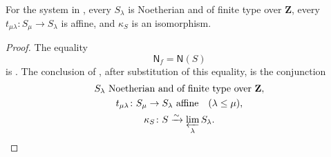 \begin{lemma}
  \label{lemma:nagata-final-noetherian-base-system}
  \checked\lean{}

  For the system in
  , every $S_\lambda$ is
  Noetherian and of finite type over $\mathbf Z$, every
  $t_{\mu\lambda}\colon S_\mu\to S_\lambda$ is affine, and $\kappa_S$ is an
  isomorphism.
\end{lemma}

\begin{proof}
\checked
  The equality
  \[
    \mathsf N_f=\mathsf N(S)
  \]
  is .  The conclusion of
  , after substitution of this
  equality, is the conjunction
  \[
  \begin{gathered}
    S_\lambda\text{ Noetherian and of finite type over }\mathbf Z,\\
    t_{\mu\lambda}\colon S_\mu\to S_\lambda\text{ affine}
      \quad(\lambda\leq\mu),\\
    \kappa_S\colon S\xrightarrow{\sim}\varprojlim_\lambda S_\lambda.
  \end{gathered}
  \]
\end{proof}

